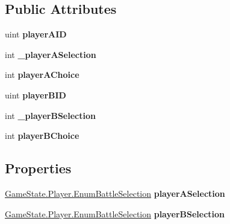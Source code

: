 \subsection*{Public Attributes}
\begin{DoxyCompactItemize}
\item 
\hypertarget{class_event_battle_prompt_selection_a3a3a30b00d2cbb9e1fd3658667b5f0bf}{uint {\bfseries player\-A\-I\-D}}\label{class_event_battle_prompt_selection_a3a3a30b00d2cbb9e1fd3658667b5f0bf}

\item 
\hypertarget{class_event_battle_prompt_selection_adb27194b379be6543169a2a56e47eabb}{int {\bfseries \-\_\-player\-A\-Selection}}\label{class_event_battle_prompt_selection_adb27194b379be6543169a2a56e47eabb}

\item 
\hypertarget{class_event_battle_prompt_selection_a2a6c2af764a1838c48c1ecafdfc0a0f0}{int {\bfseries player\-A\-Choice}}\label{class_event_battle_prompt_selection_a2a6c2af764a1838c48c1ecafdfc0a0f0}

\item 
\hypertarget{class_event_battle_prompt_selection_ab50685401b7d5cc0491616b1515a66cb}{uint {\bfseries player\-B\-I\-D}}\label{class_event_battle_prompt_selection_ab50685401b7d5cc0491616b1515a66cb}

\item 
\hypertarget{class_event_battle_prompt_selection_acd387c1dfc6906e2c69bc9cc7e6febf6}{int {\bfseries \-\_\-player\-B\-Selection}}\label{class_event_battle_prompt_selection_acd387c1dfc6906e2c69bc9cc7e6febf6}

\item 
\hypertarget{class_event_battle_prompt_selection_a7792914c7817740ed88e6d6f5f2a5356}{int {\bfseries player\-B\-Choice}}\label{class_event_battle_prompt_selection_a7792914c7817740ed88e6d6f5f2a5356}

\end{DoxyCompactItemize}
\subsection*{Properties}
\begin{DoxyCompactItemize}
\item 
\hypertarget{class_event_battle_prompt_selection_a137eb22d4fd75f6dad9c3138803b1ca2}{\hyperlink{class_game_state_1_1_player_a9f54c5eca1e60acbaa2074e981f51615}{Game\-State.\-Player.\-Enum\-Battle\-Selection} {\bfseries player\-A\-Selection}}\label{class_event_battle_prompt_selection_a137eb22d4fd75f6dad9c3138803b1ca2}

\item 
\hypertarget{class_event_battle_prompt_selection_a4c9ef4993da9b8ca79ef969eef61c2e4}{\hyperlink{class_game_state_1_1_player_a9f54c5eca1e60acbaa2074e981f51615}{Game\-State.\-Player.\-Enum\-Battle\-Selection} {\bfseries player\-B\-Selection}}\label{class_event_battle_prompt_selection_a4c9ef4993da9b8ca79ef969eef61c2e4}

\end{DoxyCompactItemize}
